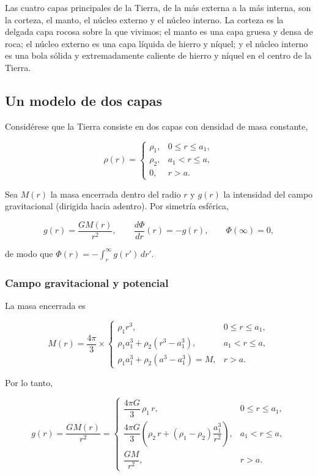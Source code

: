 Las cuatro capas principales de la Tierra, de la más externa a la más interna, son la corteza, el manto, el núcleo externo y el núcleo interno. La corteza es la delgada capa rocosa sobre la que vivimos; el manto es una capa gruesa y densa de roca; el núcleo externo es una capa líquida de hierro y níquel; y el núcleo interno es una bola sólida y extremadamente caliente de hierro y níquel en el centro de la Tierra.

\subsection{Un modelo de dos capas}

Considérese que la Tierra consiste en dos capas con densidad de masa constante,

$$ \rho(r) = \begin{cases} \rho_1, & 0 \le r \le a_1, \\ \rho_2, & a_1 < r \le a, \\ 0, & r > a. \end{cases} $$

Sea $M(r)$ la masa encerrada dentro del radio $r$ y $g(r)$ la intensidad del campo gravitacional (dirigida hacia adentro). Por simetría esférica,

$$ g(r) = \frac{GM(r)}{r^2}, \qquad \frac{d\Phi}{dr}(r) = -g(r), \qquad \Phi(\infty) = 0, $$

de modo que $\Phi(r) = -\int_r^\infty g(r')\,dr'$.

\subsubsection*{Campo gravitacional y potencial}

La masa encerrada es

$$ M(r) = \frac{4\pi}{3} \times \begin{cases} \rho_1 r^3, & 0 \le r \le a_1, \\ \rho_1 a_1^3 + \rho_2\left(r^3 - a_1^3\right), & a_1 < r \le a, \\ \rho_1 a_1^3 + \rho_2\left(a^3 - a_1^3\right) = M, & r > a. \end{cases} $$

Por lo tanto,

$$ g(r) = \frac{GM(r)}{r^2} = \begin{cases} \dfrac{4\pi G}{3}\,\rho_1\, r, & 0 \le r \le a_1, \\[2mm] \dfrac{4\pi G}{3}\left(\rho_2\, r + (\rho_1 - \rho_2)\dfrac{a_1^3}{r^2}\right), & a_1 < r \le a, \\[2mm] \dfrac{GM}{r^2}, & r > a. \end{cases} $$

